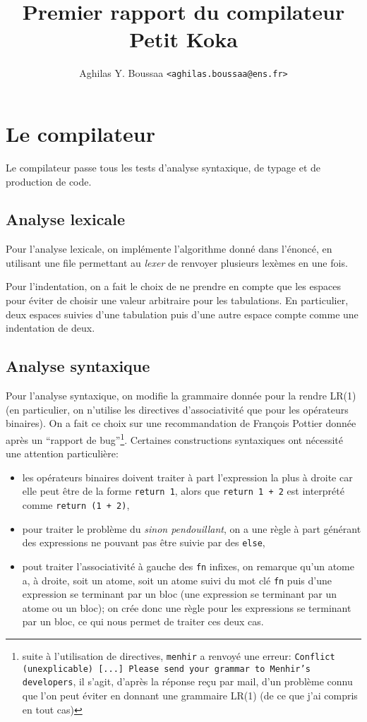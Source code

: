 \documentclass[11pt]{article}
\author{Aghilas Y. Boussaa \texttt{<aghilas.boussaa@ens.fr>}}
\title{Premier rapport du compilateur \textsf{Petit Koka}}
\begin{document}
\maketitle
\section{Le compilateur}
Le compilateur passe tous les tests d'analyse syntaxique, de typage et de
production de code.

\subsection{Analyse lexicale}
Pour l'analyse lexicale, on implémente l'algorithme donné dans l'énoncé, en
utilisant une file permettant au \textit{lexer} de renvoyer plusieurs lexèmes en une
fois.

Pour l'indentation, on a fait le choix de ne prendre en compte que les espaces
pour éviter de choisir une valeur arbitraire pour les tabulations. En
particulier, deux espaces suivies d'une tabulation puis d'une autre espace
compte comme une indentation de deux.

\subsection{Analyse syntaxique}
Pour l'analyse syntaxique, on modifie la grammaire donnée pour la rendre LR(1)
(en particulier, on n'utilise les directives d'associativité que pour les
opérateurs binaires). On a fait ce choix sur une recommandation de François
Pottier donnée après un ``rapport de bug''\footnote{suite à l'utilisation de
directives, \texttt{menhir} a renvoyé une erreur: \texttt{Conflict
  (unexplicable) [...]  Please send your grammar to Menhir's developers}, il
s'agit, d'après la réponse reçu par mail, d'un problème connu que l'on peut
éviter en donnant une grammaire LR(1) (de ce que j'ai compris en tout
cas)}. Certaines constructions syntaxiques ont nécessité une attention
particulière:
\begin{itemize}
  \item les opérateurs binaires doivent traiter à part l'expression la plus à
    droite car elle peut être de la forme \texttt{return 1}, alors que
    \texttt{return 1 + 2} est interprété comme \texttt{return (1 + 2)},
  \item pour traiter le problème du \textit{sinon pendouillant}, on a une règle
    à part générant des expressions ne pouvant pas être suivie par des
    \texttt{else},
  \item pout traiter l'associativité à gauche des \texttt{fn} infixes, on
    remarque qu'un atome a, à droite, soit un atome, soit un atome suivi du mot
    clé \texttt{fn} puis d'une expression se terminant par un bloc (une
    expression se terminant par un atome ou un bloc); on crée donc une règle
    pour les expressions se terminant par un bloc, ce qui nous permet de traiter
    ces deux cas.
\end{itemize}
\end{document}
